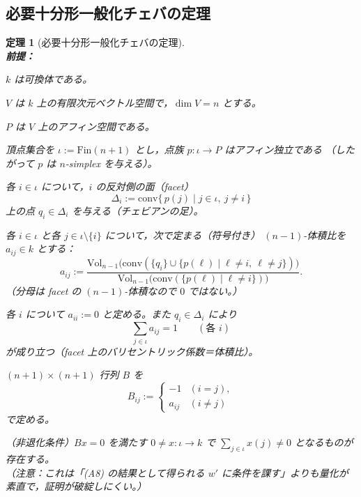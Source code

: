 \documentclass[a4paper,12pt]{bxjsbook}
\theoremstyle{theorem}
\newtheorem{theorem}{定理}[chapter]
\begin{document}
    \subsection{必要十分形一般化チェバの定理}
    \begin{theorem}[必要十分形一般化チェバの定理]
        \noindent\textbf{\\前提：}\par
        \begin{theoremenumerate}[label=(A\arabic*), leftmargin=4em, topsep=2pt, partopsep=0pt, itemsep=0pt, parsep=0pt]
            \item $k$ は可換体である。
            \item $V$ は $k$ 上の有限次元ベクトル空間で，$\dim V=n$ とする。
            \item $P$ は $V$ 上のアフィン空間である。
            \item 頂点集合を $\iota:=\mathrm{Fin}(n+1)$ とし，点族 $p:\iota\to P$ はアフィン独立である
            （したがって $p$ は $n$-simplex を与える）。
            \item 各 $i\in\iota$ について，$i$ の反対側の面（facet）
            \[
              \Delta_i := \mathrm{conv}\{\,p(j)\mid j\in\iota,\ j\neq i\,\}
            \]
            上の点 $q_i\in \Delta_i$ を与える（チェビアンの足）。
            \item 各 $i\in\iota$ と各 $j\in\iota\setminus\{i\}$ について，次で定まる（符号付き）
            $(n-1)$-体積比を $a_{ij}\in k$ とする：
            \[
              a_{ij}
              :=
              \frac{\mathrm{Vol}_{n-1}\big(\mathrm{conv}(\{q_i\}\cup\{p(\ell)\mid \ell\neq i,\ \ell\neq j\})\big)}
                   {\mathrm{Vol}_{n-1}\big(\mathrm{conv}(\{p(\ell)\mid \ell\neq i\})\big)}.
            \]
            （分母は facet の $(n-1)$-体積なので $0$ ではない。）
            \item 各 $i$ について $a_{ii}:=0$ と定める。また $q_i\in\Delta_i$ により
            \[
              \sum_{j\in\iota} a_{ij} = 1
              \qquad(\text{各 }i)
            \]
            が成り立つ（facet 上のバリセントリック係数＝体積比）。
            \item $(n+1)\times(n+1)$ 行列 $B$ を
            \[
              B_{ij}:=
              \begin{cases}
                -1 & (i=j),\\
                a_{ij} & (i\neq j)
              \end{cases}
            \]
            で定める。
            \item （非退化条件）$Bx=0$ を満たす $0\neq x:\iota\to k$ で $\sum_{j\in\iota}x(j)\neq 0$ となるものが存在する。
            \\
            \textnormal{（注意：これは「(A8) の結果として得られる $w'$ に条件を課す」よりも量化が素直で，証明が破綻しにくい。）}
        \end{theoremenumerate}
        

\end{theorem}
\end{document}
